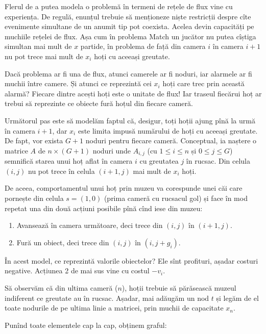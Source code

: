 \documentclass[../main.tex]{subfiles}
\begin{document}
Flerul de a putea modela o problemă în termeni de rețele de flux vine cu experiența. De regulă, enunțul trebuie să menționeze niște restricții despre cîte evenimente simultane de un anumit tip pot coexista. Acelea devin capacități pe muchiile rețelei de flux. Așa cum în problema Match un jucător nu putea cîștiga simultan mai mult de $x$ partide, în problema de față din camera $i$ în camera $i + 1$ nu pot trece mai mult de $x_i$ hoți cu aceeași greutate.

Dacă problema ar fi una de flux, atunci camerele ar fi noduri, iar alarmele ar fi muchii între camere. Și atunci ce reprezintă cei $x_i$ hoți care trec prin această alarmă? Fiecare dintre acești hoți este o unitate de flux! Iar traseul fiecărui hoț ar trebui să reprezinte ce obiecte fură hoțul din fiecare cameră.

Următorul pas este să modelăm faptul că, desigur, toți hoții ajung pînă la urmă în camera $i+1$, dar $x_i$ este limita impusă numărului de hoți cu aceeași greutate. De fapt, vor exista $G + 1$ noduri pentru fiecare cameră. Conceptual, ia naștere o matrice $A$ de $n \times (G + 1)$ noduri unde $A_{i,j}$ (cu $1 \leq i \leq n$ și $0 \leq j \leq G$) semnifică starea unui hoț aflat în camera $i$ cu greutatea $j$ în rucsac. Din celula $(i, j)$ nu pot trece în celula $(i + 1, j)$ mai mult de $x_i$ hoți.

De aceea, comportamentul unui hoț prin muzeu va corespunde unei căi care pornește din celula $s = (1, 0)$ (prima cameră cu rucsacul gol) și face în mod repetat una din două acțiuni posibile pînă cînd iese din muzeu:

\begin{enumerate}
  \item Avansează în camera următoare, deci trece din $(i, j)$ în $(i + 1, j)$.
  \item Fură un obiect, deci trece din $(i, j)$ în $(i, j + g_i)$.
\end{enumerate}

În acest model, ce reprezintă valorile obiectelor? Ele sînt profituri, așadar costuri negative. Acțiunea 2 de mai sus vine cu costul $-v_i$.

Să observăm că din ultima cameră ($n$), hoții trebuie să părăsească muzeul indiferent ce greutate au în rucsac. Așadar, mai adăugăm un nod $t$ și legăm de el toate nodurile de pe ultima linie a matricei, prin muchii de capacitate $x_n$.

Punînd toate elementele cap la cap, obținem graful:
\end{document}
